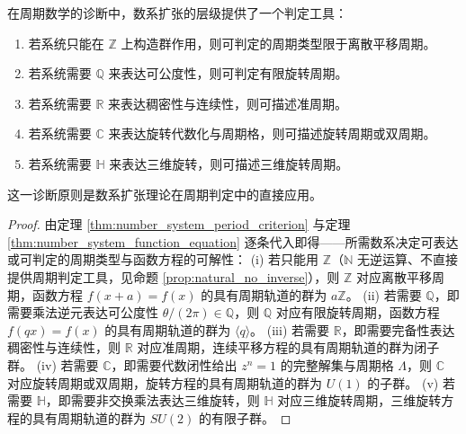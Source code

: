 \begin{corollary}[数系扩张的周期诊断意义]\label{cor:number_system_diagnosis}
在周期数学的诊断中，数系扩张的层级提供了一个判定工具：
\begin{enumerate}[label=(\roman*)]
    \item 若系统只能在 $\mathbb{Z}$ 上构造群作用，则可判定的周期类型限于离散平移周期。
    \item 若系统需要 $\mathbb{Q}$ 来表达可公度性，则可判定有限旋转周期。
    \item 若系统需要 $\mathbb{R}$ 来表达稠密性与连续性，则可描述准周期。
    \item 若系统需要 $\mathbb{C}$ 来表达旋转代数化与周期格，则可描述旋转周期或双周期。
    \item 若系统需要 $\mathbb{H}$ 来表达三维旋转，则可描述三维旋转周期。
\end{enumerate}
这一诊断原则是数系扩张理论在周期判定中的直接应用。
\end{corollary}

\begin{proof}
由定理 \ref{thm:number_system_period_criterion} 与定理 \ref{thm:number_system_function_equation} 逐条代入即得——所需数系决定可表达或可判定的周期类型与函数方程的可解性：
(i) 若只能用 $\mathbb{Z}$（$\mathbb{N}$ 无逆运算、不直接提供周期判定工具，见命题 \ref{prop:natural_no_inverse}），则 $\mathbb{Z}$ 对应离散平移周期，函数方程 $f(x+a)=f(x)$ 的具有周期轨道的群为 $a\mathbb{Z}$。
(ii) 若需要 $\mathbb{Q}$，即需要乘法逆元表达可公度性 $\theta/(2\pi)\in\mathbb{Q}$，则 $\mathbb{Q}$ 对应有限旋转周期，函数方程 $f(qx)=f(x)$ 的具有周期轨道的群为 $\langle q\rangle$。
(iii) 若需要 $\mathbb{R}$，即需要完备性表达稠密性与连续性，则 $\mathbb{R}$ 对应准周期，连续平移方程的具有周期轨道的群为闭子群。
(iv) 若需要 $\mathbb{C}$，即需要代数闭性给出 $z^n = 1$ 的完整解集与周期格 $\Lambda$，则 $\mathbb{C}$ 对应旋转周期或双周期，旋转方程的具有周期轨道的群为 $U(1)$ 的子群。
(v) 若需要 $\mathbb{H}$，即需要非交换乘法表达三维旋转，则 $\mathbb{H}$ 对应三维旋转周期，三维旋转方程的具有周期轨道的群为 $SU(2)$ 的有限子群。
\end{proof}

